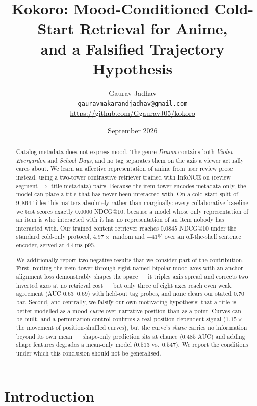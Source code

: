 \documentclass[11pt,a4paper]{article}
\title{\textbf{Kokoro}: Mood-Conditioned Cold-Start Retrieval for Anime,\\
       and a Falsified Trajectory Hypothesis}
\author{Gaurav Jadhav\\
        \small\texttt{gauravmakarandjadhav@gmail.com}\\
        \small\url{https://github.com/GgauravJ05/kokoro}}
\date{September 2026}
\begin{document}
\maketitle

\begin{abstract}
Catalog metadata does not express mood. The genre \emph{Drama} contains both
\emph{Violet Evergarden} and \emph{School Days}, and no tag separates them on
the axis a viewer actually cares about. We learn an affective representation of
anime from user review prose instead, using a two-tower contrastive retriever
trained with InfoNCE on (review segment $\rightarrow$ title metadata) pairs.
Because the item tower encodes metadata only, the model can place a title that
has never been interacted with. On a cold-start split of $9{,}864$ titles this
matters absolutely rather than marginally: every collaborative baseline we test
scores exactly $0.0000$ NDCG@10, because a model whose only representation of an
item is who interacted with it has no representation of an item nobody has
interacted with. Our trained content retriever reaches $0.0845$ NDCG@10 under
the standard cold-only protocol, $4.97\times$ random and $+41\%$ over an
off-the-shelf sentence encoder, served at $4.4$\,ms p95.

We additionally report two negative results that we consider part of the
contribution. First, routing the item tower through eight named bipolar mood
axes with an anchor-alignment loss demonstrably shapes the space --- it triples
axis spread and corrects two inverted axes at no retrieval cost --- but only
three of eight axes reach even weak agreement (AUC $0.63$--$0.69$) with held-out
tag probes, and none clears our stated $0.70$ bar. Second, and centrally, we
falsify our own motivating hypothesis: that a title is better modelled as a mood
\emph{curve} over narrative position than as a point. Curves can be built, and a
permutation control confirms a real position-dependent signal ($1.15\times$ the
movement of position-shuffled curves), but the curve's \emph{shape} carries no
information beyond its own mean --- shape-only prediction sits at chance
($0.485$ AUC) and adding shape features degrades a mean-only model
($0.513$ vs.\ $0.547$). We report the conditions under which this conclusion
should not be generalised.
\end{abstract}

\section{Introduction}
\end{document}
